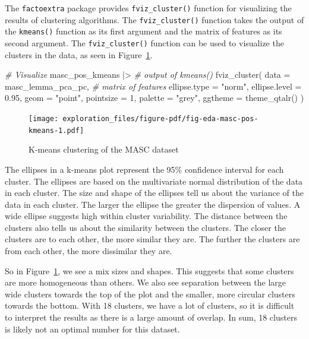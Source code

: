 \documentclass[
  letterpaper,
  DIV=11,
  numbers=noendperiod]{scrreport}
\newenvironment{Shaded}{\begin{snugshade}}{\end{snugshade}}
\newcommand{\AttributeTok}[1]{\textcolor[rgb]{0.00,0.00,0.00}{#1}}
\newcommand{\CommentTok}[1]{\textcolor[rgb]{0.00,0.00,0.00}{\textit{#1}}}
\newcommand{\DecValTok}[1]{\textcolor[rgb]{0.00,0.00,0.00}{#1}}
\newcommand{\FloatTok}[1]{\textcolor[rgb]{0.00,0.00,0.00}{#1}}
\newcommand{\FunctionTok}[1]{\textcolor[rgb]{0.00,0.00,0.00}{#1}}
\newcommand{\NormalTok}[1]{\textcolor[rgb]{0.00,0.00,0.00}{#1}}
\newcommand{\SpecialCharTok}[1]{\textcolor[rgb]{0.00,0.00,0.00}{#1}}
\newcommand{\StringTok}[1]{\textcolor[rgb]{0.00,0.00,0.00}{#1}}
\theoremstyle{definition}
\theoremstyle{remark}
\begin{document}
The \texttt{factoextra} package provides \texttt{fviz\_cluster()}
function for visualizing the results of clustering algorithms. The
\texttt{fviz\_cluster()} function takes the output of the
\texttt{kmeans()} function as its first argument and the matrix of
features as its second argument. The \texttt{fviz\_cluster()} function
can be used to visualize the clusters in the data, as seen in
Figure~\ref{fig-eda-masc-pos-kmeans}.

\begin{Shaded}
\begin{Highlighting}[]
\CommentTok{\# Visualize}
\NormalTok{masc\_pos\_kmeans }\SpecialCharTok{|\textgreater{}}  \CommentTok{\# output of kmeans()}
  \FunctionTok{fviz\_cluster}\NormalTok{(}
    \AttributeTok{data =}\NormalTok{ masc\_lemma\_pca\_pc, }\CommentTok{\# matrix of features}
    \AttributeTok{ellipse.type =} \StringTok{"norm"}\NormalTok{,}
    \AttributeTok{ellipse.level =} \FloatTok{0.95}\NormalTok{,}
    \AttributeTok{geom =} \StringTok{"point"}\NormalTok{,}
    \AttributeTok{pointsize =} \DecValTok{1}\NormalTok{,}
    \AttributeTok{palette =} \StringTok{"grey"}\NormalTok{,}
    \AttributeTok{ggtheme =} \FunctionTok{theme\_qtalr}\NormalTok{()}
\NormalTok{  )}
\end{Highlighting}
\end{Shaded}

\begin{figure}[H]

{\centering \texttt{[image: exploration\_files/figure-pdf/fig-eda-masc-pos-kmeans-1.pdf]}

}

\caption{\label{fig-eda-masc-pos-kmeans}K-means clustering of the MASC
dataset}

\end{figure}

The ellipses in a k-means plot represent the 95\% confidence interval
for each cluster. The ellipses are based on the multivariate normal
distribution of the data in each cluster. The size and shape of the
ellipses tell us about the variance of the data in each cluster. The
larger the ellipse the greater the dispersion of values. A wide ellipse
suggests high within cluster variability. The distance between the
clusters also tells us about the similarity between the clusters. The
closer the clusters are to each other, the more similar they are. The
further the clusters are from each other, the more dissimilar they are.

So in Figure~\ref{fig-eda-masc-pos-kmeans}, we see a mix sizes and
shapes. This suggests that some clusters are more homogeneous than
others. We also see separation between the large wide clusters towards
the top of the plot and the smaller, more circular clusters towards the
bottom. With 18 clusters, we have a lot of clusters, so it is difficult
to interpret the results as there is a large amount of overlap. In sum,
18 clusters is likely not an optimal number for this dataset.
\end{document}
